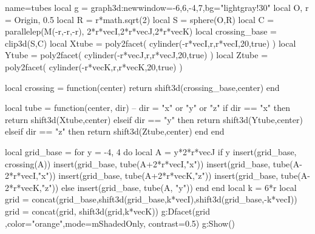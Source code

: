 \documentclass[boder=5pt]{standalone}
\begin{document}
\begin{luadraw}{name=tubes}
local g = graph3d:new{window={-6,6,-4,7},bg="lightgray!30" }
local O, r = Origin, 0.5
local R  = r*math.sqrt(2)
local S = sphere(O,R)
local C = parallelep(M(-r,-r,-r), 2*r*vecI,2*r*vecJ,2*r*vecK)
local crossing_base = clip3d(S,C)
local Xtube = poly2facet( cylinder(-r*vecI,r,r*vecI,20,true) )
local Ytube = poly2facet( cylinder(-r*vecJ,r,r*vecJ,20,true) )
local Ztube = poly2facet( cylinder(-r*vecK,r,r*vecK,20,true) )

local crossing = function(center)
    return shift3d(crossing_base,center)
end

local tube = function(center, dir) -- dir = "x" or "y" or "z"
    if dir == "x" then return shift3d(Xtube,center)
    elseif dir == "y" then return shift3d(Ytube,center)
    elseif dir == "z" then return shift3d(Ztube,center)
    end
end

local grid_base = {}
for y = -4, 4  do
    local A = y*2*r*vecJ
    if y%
        insert(grid_base, crossing(A))
        insert(grid_base, tube(A+2*r*vecI,"x"))
        insert(grid_base, tube(A-2*r*vecI,"x"))
        insert(grid_base, tube(A+2*r*vecK,"z"))
        insert(grid_base, tube(A-2*r*vecK,"z"))
    else
        insert(grid_base, tube(A, "y"))
    end
end
local k = 6*r
local grid = concat(grid_base,shift3d(grid_base,k*vecI),shift3d(grid_base,-k*vecI))
grid = concat(grid, shift3d(grid,k*vecK))
g:Dfacet(grid ,{color="orange",mode=mShadedOnly, contrast=0.5})
g:Show()
\end{luadraw}
\end{document}
